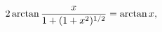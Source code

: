 \[2\mathop{\mathrm{arctan}\/}\nolimits\frac{x}{1+(1+x^{2})^{1/2}}=\mathop{%
\mathrm{arctan}\/}\nolimits x,\]